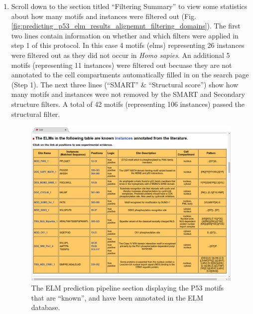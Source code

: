 \begin{enumerate}
\item Scroll down to the section titled ``Filtering Summary'' to view some
	statistics about how many motifs and instances were filtered out
	(Fig.
	\ref{fig:predicting_p53_elm_results_alignemnt_filtering_domains}).
	The first two lines contain information on whether
	and which filters were applied in step 1 of this protocol.
	In this case 4 motifs (elms) representing 26 instances were filtered
	out as they did not occur in \textit{Homo sapies}. An additional 5
	motifs (representing 11 instances) were filtered out becuase they are
	not annotated to the cell compartments automatically filled in on the
	search page (Step 1).
	The next three lines (``SMART'' \& ``Structural score'') show how many
	motifs and instances were not removed by the SMART and Secondary
	structure filters. A total of 42 motifs (representing 106 instances)
	passed the structural filter.


\begin{figure}[h!]
	\centering
	\includegraphics[width=\textwidth]{Figures/predicting_p53/elm_results_known.png} 
	\caption{
		The ELM prediction pipeline section displaying the P53 motifs
		that are ``known'', and have been annotated in the ELM
		database.
	}
	\label{fig:predicting_p53_elm_results_known}
\end{figure}


\end{enumerate}

